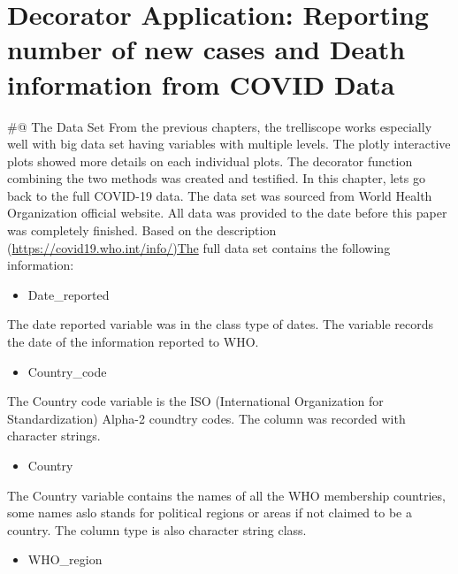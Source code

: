 \documentclass[
]{article}
\providecommand{\tightlist}{%
  \setlength{\itemsep}{0pt}\setlength{\parskip}{0pt}}
\begin{document}
\hypertarget{decorator-application-reporting-number-of-new-cases-and-death-information-from-covid-data}{%
\section{Decorator Application: Reporting number of new cases and Death
information from COVID
Data}\label{decorator-application-reporting-number-of-new-cases-and-death-information-from-covid-data}}

\#@ The Data Set From the previous chapters, the trelliscope works
especially well with big data set having variables with multiple levels.
The plotly interactive plots showed more details on each individual
plots. The decorator function combining the two methods was created and
testified. In this chapter, lets go back to the full COVID-19 data. The
data set was sourced from World Health Organization official website.
All data was provided to the date before this paper was completely
finished. Based on the description
(\url{https://covid19.who.int/info/)The} full data set contains the
following information:

\begin{itemize}
\tightlist
\item
  Date\_reported
\end{itemize}

The date reported variable was in the class type of dates. The variable
records the date of the information reported to WHO.

\begin{itemize}
\tightlist
\item
  Country\_code
\end{itemize}

The Country code variable is the ISO (International Organization for
Standardization) Alpha-2 coundtry codes. The column was recorded with
character strings.

\begin{itemize}
\tightlist
\item
  Country
\end{itemize}

The Country variable contains the names of all the WHO membership
countries, some names aslo stands for political regions or areas if not
claimed to be a country. The column type is also character string class.

\begin{itemize}
\tightlist
\item
  WHO\_region
\end{itemize}
\end{document}
